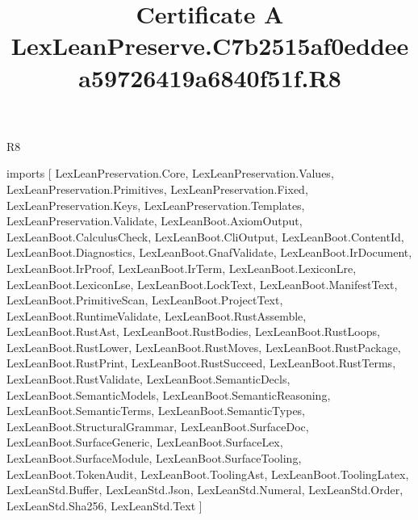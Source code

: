 \begin{lexlean}{R8}
\title{Certificate A LexLeanPreserve.C7b2515af0eddeea59726419a6840f51f.R8}
\begin{coremodule}
imports [
  LexLeanPreservation.Core,
  LexLeanPreservation.Values,
  LexLeanPreservation.Primitives,
  LexLeanPreservation.Fixed,
  LexLeanPreservation.Keys,
  LexLeanPreservation.Templates,
  LexLeanPreservation.Validate,
  LexLeanBoot.AxiomOutput,
  LexLeanBoot.CalculusCheck,
  LexLeanBoot.CliOutput,
  LexLeanBoot.ContentId,
  LexLeanBoot.Diagnostics,
  LexLeanBoot.GnafValidate,
  LexLeanBoot.IrDocument,
  LexLeanBoot.IrProof,
  LexLeanBoot.IrTerm,
  LexLeanBoot.LexiconLre,
  LexLeanBoot.LexiconLse,
  LexLeanBoot.LockText,
  LexLeanBoot.ManifestText,
  LexLeanBoot.PrimitiveScan,
  LexLeanBoot.ProjectText,
  LexLeanBoot.RuntimeValidate,
  LexLeanBoot.RustAssemble,
  LexLeanBoot.RustAst,
  LexLeanBoot.RustBodies,
  LexLeanBoot.RustLoops,
  LexLeanBoot.RustLower,
  LexLeanBoot.RustMoves,
  LexLeanBoot.RustPackage,
  LexLeanBoot.RustPrint,
  LexLeanBoot.RustSucceed,
  LexLeanBoot.RustTerms,
  LexLeanBoot.RustValidate,
  LexLeanBoot.SemanticDecls,
  LexLeanBoot.SemanticModels,
  LexLeanBoot.SemanticReasoning,
  LexLeanBoot.SemanticTerms,
  LexLeanBoot.SemanticTypes,
  LexLeanBoot.StructuralGrammar,
  LexLeanBoot.SurfaceDoc,
  LexLeanBoot.SurfaceGeneric,
  LexLeanBoot.SurfaceLex,
  LexLeanBoot.SurfaceModule,
  LexLeanBoot.SurfaceTooling,
  LexLeanBoot.TokenAudit,
  LexLeanBoot.ToolingAst,
  LexLeanBoot.ToolingLatex,
  LexLeanStd.Buffer,
  LexLeanStd.Json,
  LexLeanStd.Numeral,
  LexLeanStd.Order,
  LexLeanStd.Sha256,
  LexLeanStd.Text
]


\end{coremodule}
\end{lexlean}
